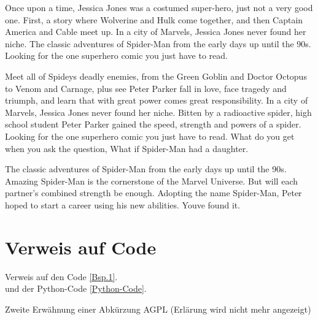 Once upon a time, Jessica Jones was a costumed super-hero, just not a very good one. First, a story where Wolverine and Hulk come together, and then Captain America and Cable meet up. In a city of Marvels, Jessica Jones never found her niche. The classic adventures of Spider-Man from the early days up until the 90s. Looking for the one superhero comic you just have to read.

Meet all of Spideys deadly enemies, from the Green Goblin and Doctor Octopus to Venom and Carnage, plus see Peter Parker fall in love, face tragedy and triumph, and learn that with great power comes great responsibility. In a city of Marvels, Jessica Jones never found her niche. Bitten by a radioactive spider, high school student Peter Parker gained the speed, strength and powers of a spider. Looking for the one superhero comic you just have to read. What do you get when you ask the question, What if Spider-Man had a daughter.

The classic adventures of Spider-Man from the early days up until the 90s. Amazing Spider-Man is the cornerstone of the Marvel Universe. But will each partner's combined strength be enough. Adopting the name Spider-Man, Peter hoped to start a career using his new abilities. Youve found it.

\section{Verweis auf Code}
Verweis auf den Code \autoref{Bsp.1}.\\
und der Python-Code \autoref{Python-Code}.

Zweite Erwähnung einer Abkürzung \gls{AGPL} (Erlärung wird nicht mehr angezeigt)
